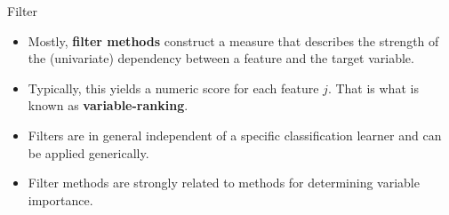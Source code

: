 \documentclass[11pt,compress,t,notes=noshow, xcolor=table]{beamer}
\begin{document}

  \begin{vbframe}{Filter}

  \begin{itemize}
    \item Mostly, \textbf{filter methods} construct a measure that describes the strength of the (univariate) dependency between a feature and the target variable.
    \item Typically, this yields a numeric score for each feature $j$.
    That is what is known as \textbf{variable-ranking}.
    \item Filters are in general independent of a specific classification learner and can be applied generically.
      \item Filter methods are strongly related to methods for determining variable importance.
  \end{itemize}
  \end{vbframe}
\end{document}
